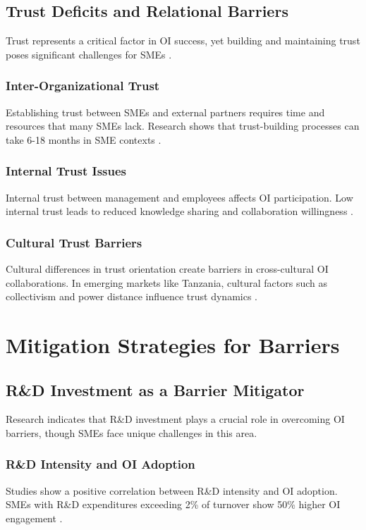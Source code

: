 \subsection{Trust Deficits and Relational Barriers}

Trust represents a critical factor in OI success, yet building and maintaining trust poses significant challenges for SMEs \citep{nahapiet1998social}.

\subsubsection{Inter-Organizational Trust}
Establishing trust between SMEs and external partners requires time and resources that many SMEs lack. Research shows that trust-building processes can take 6-18 months in SME contexts \citep{batterink2006boss}.

\subsubsection{Internal Trust Issues}
Internal trust between management and employees affects OI participation. Low internal trust leads to reduced knowledge sharing and collaboration willingness \citep{dirks2002trust}.

\subsubsection{Cultural Trust Barriers}
Cultural differences in trust orientation create barriers in cross-cultural OI collaborations. In emerging markets like Tanzania, cultural factors such as collectivism and power distance influence trust dynamics \citep{kirkman2006cultural}.

\section{Mitigation Strategies for Barriers}

\subsection{R\&D Investment as a Barrier Mitigator}

Research indicates that R\&D investment plays a crucial role in overcoming OI barriers, though SMEs face unique challenges in this area.

\subsubsection{R\&D Intensity and OI Adoption}
Studies show a positive correlation between R\&D intensity and OI adoption. SMEs with R\&D expenditures exceeding 2\% of turnover show 50\% higher OI engagement \citep{becker2006knowledge}.

